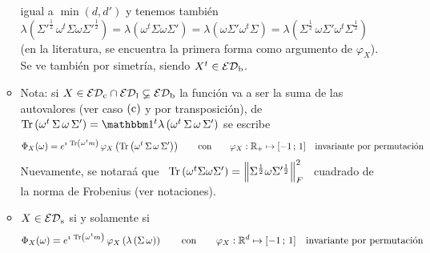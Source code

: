 \begin{itemize}
\begin{itemize}
  igual a  $\min(d,d')$ y tenemos tambi\'en  $\lambda\left( \Sigma'^{\frac12} \,
    \omega^t \Sigma  \omega \Sigma'^{\frac12} \right)  = \lambda(\omega^t \Sigma
  \omega  \Sigma') =  \lambda(\omega  \Sigma' \omega^t  \Sigma) =  \lambda\left(
    \Sigma^{\frac12}    \,     \omega    \Sigma'    \omega^t    \Sigma^{\frac12}
  \right)$~\cite[Teo.~21.10.1(2)]{Har08}  (en  la  literatura, se  encuentra  la
  primera forma como argumento de $\varphi_X$).  Se ve tambi\'en por simetr\'ia,
  siendo  $X^t \in  \mathcal{ED}_{\mathrm{b}}$.
\item  Nota:  si  $X  \in  \mathcal{ED}_{\mathrm{c}} \cap  \mathcal{ED}_{\mathrm{l}}  \varsubsetneq  \mathcal{ED}_{\mathrm{b}}$  la
  funci\'on  va a  ser  la suma  de las  autovalores  (ver caso  $(\mathrm{c})$ y  por
  transposici\'on), \ie  de $\Tr\left( \omega^t  \, \Sigma \, \omega  \, \Sigma'
  \right) = \un^t \lambda\left( \omega^t \, \Sigma \, \omega \, \Sigma' \right)$
  se escribe
  \[
  \Phi_X(\omega) = e^{\imath \, \Tr\left( \omega^t m \right)} \, \varphi_X\left(
    \Tr\left( \omega^t  \, \Sigma  \, \omega \,  \Sigma' \right)  \right) \qquad
  \mbox{con} \qquad \varphi_X: \Rset_+ \mapsto [-1 \; 1]   \quad   \mbox{invariante   por
    permutaci\'on}%
  \]
  Nuevamente,  se notara\'a  que  \ $\operatorname{Tr}\left(  \omega^t  \Sigma \omega  \Sigma'
  \right)  = \left\| \Sigma^{\frac12}  \omega \Sigma'^{\frac12}  \right\|_F^2$ \
  cuadrado de la norma de Frobenius (ver notaciones).
\item $X \in \mathcal{ED}_{\mathrm{s}}$ si y solamente si
  \[
  \Phi_X(\omega) = e^{\imath \, \Tr\left( \omega^t m \right)} \, \varphi_X\left(
    \lambda\left(  \Sigma \,  \omega  \right) \right)  \qquad \mbox{con}  \qquad
  \varphi_X:   \Rset^d   \mapsto   [-1   \;  1]   \quad   \mbox{invariante   por
    permutaci\'on}%
  \]

\end{itemize}
\end{itemize}
